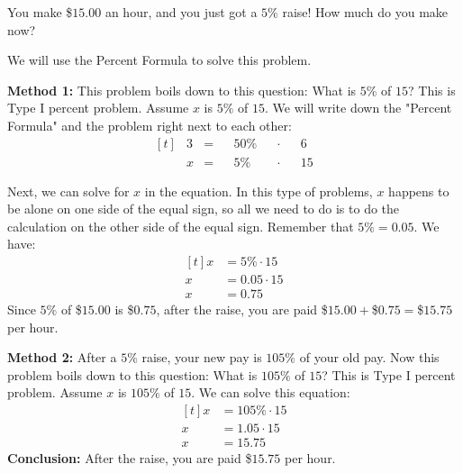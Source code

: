 \begin{myexample}
You make \$$15.00$ an hour, and you just got a $5\%$ raise! How much do you make now?
\end{myexample}
\begin{solution}
We will use the Percent Formula to solve this problem.

\textbf{Method 1: } This problem boils down to this question: What is $5\%$ of $15$? This is Type I percent problem. Assume $x$ is $5\%$ of $15$. We will write down the "Percent Formula" and the problem right next to each other:
\[
\begin{aligned}[t]
	&3 &= &&50\% &&\cdot &&6 \\
	&x &= &&5\% &&\cdot &&15
\end{aligned}
\]

Next, we can solve for $x$ in the equation. In this type of problems, $x$ happens to be alone on one side of the equal sign, so all we need to do is to do the calculation on the other side of the equal sign. Remember that $5\%=0.05$. We have:
\[
\begin{aligned}[t]
	x &= 5\% \cdot 15 \\
	x &= 0.05 \cdot 15 \\
	x &= 0.75
\end{aligned}
\]
Since $5\%$ of \$$15.00$ is \$$0.75$, after the raise, you are paid \$$15.00+$\$$0.75=$\$$15.75$ per hour.

\textbf{Method 2: } After a $5\%$ raise, your new pay is $105\%$ of your old pay. Now this problem boils down to this question: What is $105\%$ of $15$? This is Type I percent problem. Assume $x$ is $105\%$ of $15$. We can solve this equation:
\[
\begin{aligned}[t]
	x &= 105\% \cdot 15 \\
	x &= 1.05 \cdot 15 \\
	x &= 15.75
\end{aligned}
\]
\textbf{Conclusion:} After the raise, you are paid \$$15.75$ per hour.

\end{solution}

